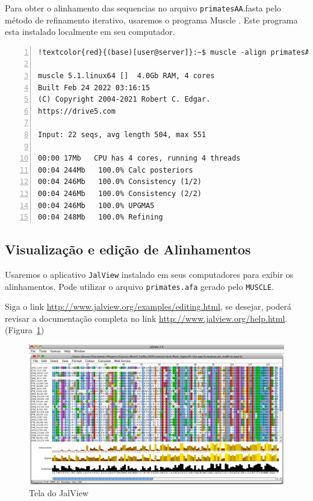 \documentclass[letter,11pt]{book}
\begin{document}
Para obter o alinhamento das sequencias no arquivo \Verb+primatesAA+.fasta pelo método de refinamento iterativo, usaremos o programa {\sc Muscle} \citep{Edgar2004}. Este programa esta instalado localmente em seu computador.

\begin{Verbatim}[commandchars=!\{\},numbers=left,label=MUSCLE,frame=topline,fontsize=\scriptsize]
	!textcolor{red}{(base)[user@server]}:~$ muscle -align primatesAA.fasta -output primates.afa

muscle 5.1.linux64 []  4.0Gb RAM, 4 cores
Built Feb 24 2022 03:16:15
(C) Copyright 2004-2021 Robert C. Edgar.
https://drive5.com

Input: 22 seqs, avg length 504, max 551

00:00 17Mb   CPU has 4 cores, running 4 threads
00:04 244Mb   100.0% Calc posteriors
00:04 246Mb   100.0% Consistency (1/2)
00:04 246Mb   100.0% Consistency (2/2)
00:04 246Mb   100.0% UPGMA5           
00:04 248Mb   100.0% Refining
\end{Verbatim} 


\subsection{Visualização e edição de Alinhamentos}

Usaremos o aplicativo \Verb+JalView+ instalado em seus computadores para exibir os alinhamentos. Pode utilizar o arquivo \Verb+primates.afa+ gerado pelo \Verb+MUSCLE+.

Siga o link \url{http://www.jalview.org/examples/editing.html}, se desejar, poderá revisar a documentação completa no link \url{http://www.jalview.org/help.html}.(Figura~\ref{fig:JalView})

\begin{figure}[h!]
\centering
 \includegraphics[width=15cm]{Figs/JalView.png}
 \caption{\label{fig:JalView}Tela do JalView}
\end{figure}
\end{document}
